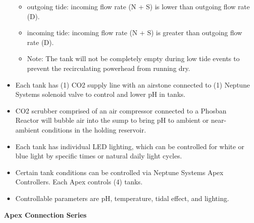 \documentclass[]{book}
\providecommand{\tightlist}{%
  \setlength{\itemsep}{0pt}\setlength{\parskip}{0pt}}
\begin{document}
\begin{itemize}
  \begin{itemize}
  \tightlist
  \item
    outgoing tide: incoming flow rate (N + S) is lower than outgoing
    flow rate (D).
  \item
    incoming tide: incoming flow rate (N + S) is greater than outgoing
    flow rate (D).
  \item
    Note: The tank will not be completely empty during low tide events
    to prevent the recirculating powerhead from running dry.\\
  \end{itemize}
\item
  Each tank has (1) CO2 supply line with an airstone connected to (1)
  Neptune Systems solenoid valve to control and lower pH in tanks.\\
\item
  CO2 scrubber comprised of an air compressor connected to a Phosban
  Reactor will bubble air into the sump to bring pH to ambient or
  near-ambient conditions in the holding reservoir.\\
\item
  Each tank has individual LED lighting, which can be controlled for
  white or blue light by specific times or natural daily light cycles.\\
\item
  Certain tank conditions can be controlled via Neptune Systems Apex
  Controllers. Each Apex controls (4) tanks.\\
\item
  Controllable parameters are pH, temperature, tidal effect, and
  lighting.
\end{itemize}

 \textbf{Apex Connection Series}
\end{document}
